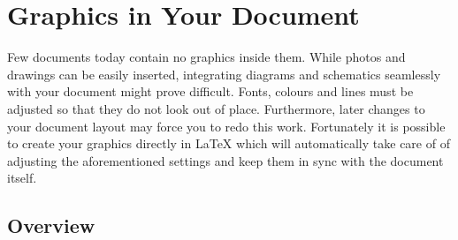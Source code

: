 %
%
%
%

\chapter{Graphics in Your Document}\label{chap:graphics}

\begin{intro}
  Few documents today contain no graphics inside them. While photos and
  drawings can be easily inserted, integrating diagrams and schematics
  seamlessly with your document might prove difficult. Fonts, colours and lines
  must be adjusted so that they do not look out of place. Furthermore, later
  changes to your document layout may force you to redo this work. Fortunately
  it is possible to create your graphics directly in \LaTeX{} which will
  automatically take care of of adjusting the aforementioned settings and keep
  them in sync with the document itself.
\end{intro}

\section{Overview}

